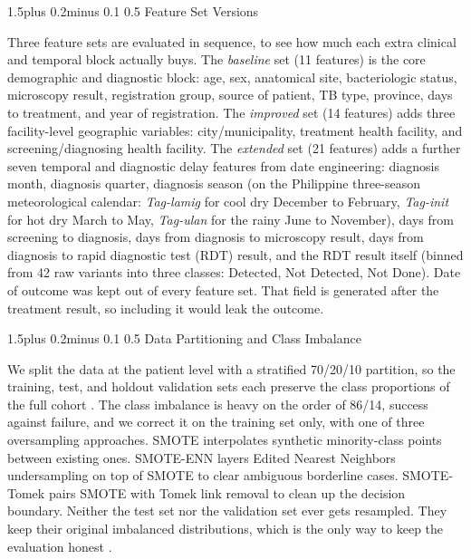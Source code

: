 \documentclass[12pt]{article}
\makeatletter
\renewcommand{\_}{\textunderscore\allowbreak}
\renewcommand{\subsubsection}{\@startsection{subsubsection}{3}{0pt}%
  {1.5\baselineskip plus 0.2\baselineskip minus 0.1\baselineskip}%
  {0.5\baselineskip}%
  {\bfseries\itshape\normalsize}}
\makeatother
\begin{document}
\subsubsection{Feature Set Versions}

Three feature sets are evaluated in sequence, to see how much each extra clinical and temporal block actually buys. The \textit{baseline} set (11 features) is the core demographic and diagnostic block: age, sex, anatomical site, bacteriologic status, microscopy result, registration group, source of patient, TB type, province, days to treatment, and year of registration. The \textit{improved} set (14 features) adds three facility-level geographic variables: city/municipality, treatment health facility, and screening/diagnosing health facility. The \textit{extended} set (21 features) adds a further seven temporal and diagnostic delay features from date engineering: diagnosis month, diagnosis quarter, diagnosis season (on the Philippine three-season meteorological calendar: \textit{Tag-lamig} for cool dry December to February, \textit{Tag-init} for hot dry March to May, \textit{Tag-ulan} for the rainy June to November), days from screening to diagnosis, days from diagnosis to microscopy result, days from diagnosis to rapid diagnostic test (RDT) result, and the RDT result itself (binned from 42 raw variants into three classes: Detected, Not Detected, Not Done). Date of outcome was kept out of every feature set. That field is generated after the treatment result, so including it would leak the outcome.

\subsubsection{Data Partitioning and Class Imbalance}

We split the data at the patient level with a stratified 70/20/10 partition, so the training, test, and holdout validation sets each preserve the class proportions of the full cohort \citep{hastie2009elements}. The class imbalance is heavy on the order of 86/14, success against failure, and we correct it on the training set only, with one of three oversampling approaches. SMOTE \citep{chawla2002smote} interpolates synthetic minority-class points between existing ones. SMOTE-ENN \citep{batista2004study,nishat2022smoteenn} layers Edited Nearest Neighbors undersampling on top of SMOTE to clear ambiguous borderline cases. SMOTE-Tomek \citep{batista2004study} pairs SMOTE with Tomek link removal to clean up the decision boundary. Neither the test set nor the validation set ever gets resampled. They keep their original imbalanced distributions, which is the only way to keep the evaluation honest \citep{salmi2024imbalanced}.
\end{document}
